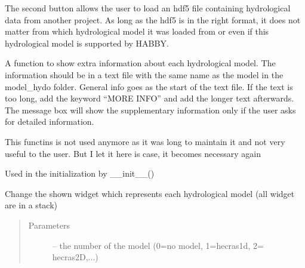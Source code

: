 \documentclass[letterpaper,10pt,english]{sphinxmanual}
\begin{document}
\begin{fulllineitems}
\begin{itemize}
\end{itemize}

The second button allows the user to load an hdf5 file containing hydrological data from another project.
As long as the hdf5 is in the right format, it does not matter from which hydrological model it was loaded from
or even if this hydrological model is supported by HABBY.

\begin{fulllineitems}
\label{\detokenize{index:src_GUI.hydro_GUI_2.Hydro2W.give_info_model}}
A function to show extra information about each hydrological model.
The information should be in a text file with the same name as the model in the model\_hydo folder.
General info goes as the start of the text file. If the text is too long, add the keyword ``MORE INFO''
and add the longer text afterwards. The message box will show the supplementary information only if the user
asks for detailed information.

This functins is not used anymore as it was long to maintain it and not very useful to the user. But I let it
here is case, it becomes necessary again

\end{fulllineitems}


\begin{fulllineitems}
\label{\detokenize{index:src_GUI.hydro_GUI_2.Hydro2W.init_iu}}
Used in the initialization by \_\_init\_\_()

\end{fulllineitems}


\begin{fulllineitems}
\label{\detokenize{index:src_GUI.hydro_GUI_2.Hydro2W.selectionchange}}
Change the shown widget which represents each hydrological model (all widget are in a stack)
\begin{quote}\begin{description}
\item[{Parameters}] \leavevmode
{} -- the number of the model (0=no model, 1=hecras1d, 2= hecras2D,...)


\end{description}
\end{quote}
\end{fulllineitems}
\end{fulllineitems}
\end{document}
